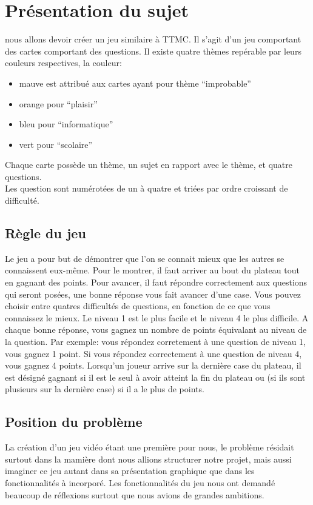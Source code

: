 \section{Présentation du sujet}
nous allons devoir créer un jeu similaire à TTMC.
Il s'agit d'un jeu comportant des cartes comportant des questions. Il existe quatre thèmes repérable par leurs couleurs respectives, la couleur:
\begin{itemize}
	\item mauve est attribué aux cartes ayant pour thème ``improbable''
	\item orange pour ``plaisir''
	\item bleu pour ``informatique''
	\item vert pour ``scolaire''
\end{itemize}
Chaque carte possède un thème, un sujet en rapport avec le thème, et quatre questions.\\
Les question sont numérotées de un à quatre et triées par ordre croissant de difficulté.
\subsection{Règle du jeu}
Le jeu a pour but de démontrer que l'on se connait mieux que les autres se connaissent eux-même.
Pour le montrer, il faut arriver au bout du plateau tout en gagnant des points.
Pour avancer, il faut répondre correctement aux questions qui seront posées, une bonne réponse vous fait avancer d'une case.
Vous pouvez choisir entre quatres difficultés de questions, en fonction de ce que vous connaissez le mieux. Le niveau 1 est le plus facile et le niveau 4 le plus difficile.
A chaque bonne réponse, vous gagnez un nombre de points équivalant au niveau de la question. Par exemple: vous répondez corretement à une question de niveau 1, vous gagnez 1 point. Si vous répondez correctement à une question de niveau 4, 
vous gagnez 4 points. Lorsqu'un joueur arrive sur la dernière case du plateau, il est désigné gagnant si il est le seul à avoir atteint la fin du plateau ou (si ils sont plusieurs sur la dernière case) si il a le plus de points. 

\subsection{Position du problème}
La création d'un jeu vidéo étant une première pour nous, le problème résidait surtout dans la mamière dont nous allions structurer notre projet, mais aussi imaginer ce jeu autant dans sa présentation graphique que dans les fonctionnalités à
incorporé. Les fonctionnalités du jeu nous ont demandé beaucoup de réflexions surtout que nous avions de grandes ambitions.
